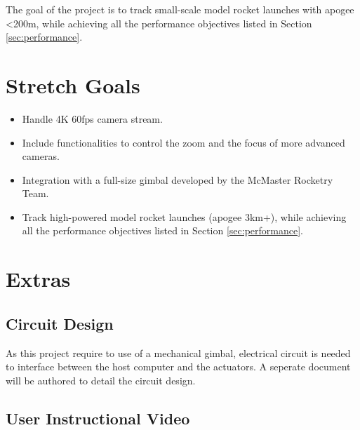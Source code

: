 \documentclass{article}
\begin{document}
The goal of the project is to track small-scale model rocket launches with
apogee \textless 200m, while achieving all the performance objectives listed in
Section \ref{sec:performance}.

\section{Stretch Goals}

\begin{itemize}
  \item Handle 4K 60fps camera stream.
  \item Include functionalities to control the zoom and the focus of more advanced
        cameras.
  \item Integration with a full-size gimbal developed by the McMaster Rocketry Team.
  \item Track high-powered model rocket launches (apogee 3km+), while achieving all the
        performance objectives listed in Section \ref{sec:performance}.
\end{itemize}

\section{Extras}


\subsection{Circuit Design}

As this project require to use of a mechanical gimbal, electrical circuit is
needed to interface between the host computer and the actuators. A seperate
document will be authored to detail the circuit design.

\subsection{User Instructional Video}
\end{document}
